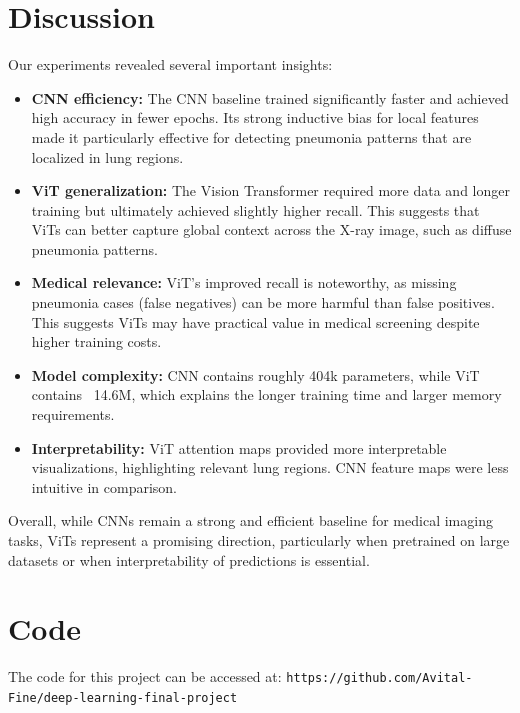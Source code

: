 \documentclass{article}
\begin{document}
\section{Discussion}

Our experiments revealed several important insights:

\begin{itemize}
    \item \textbf{CNN efficiency:} The CNN baseline trained significantly faster and achieved high accuracy in fewer epochs. Its strong inductive bias for local features made it particularly effective for detecting pneumonia patterns that are localized in lung regions.
    \item \textbf{ViT generalization:} The Vision Transformer required more data and longer training but ultimately achieved slightly higher recall. This suggests that ViTs can better capture global context across the X-ray image, such as diffuse pneumonia patterns.
    \item \textbf{Medical relevance:} ViT’s improved recall is noteworthy, as missing pneumonia cases (false negatives) can be more harmful than false positives. This suggests ViTs may have practical value in medical screening despite higher training costs.
    \item \textbf{Model complexity:} CNN contains roughly 404k parameters, while ViT contains ~14.6M, which explains the longer training time and larger memory requirements.
    \item \textbf{Interpretability:} ViT attention maps provided more interpretable visualizations, highlighting relevant lung regions. CNN feature maps were less intuitive in comparison.
\end{itemize}

Overall, while CNNs remain a strong and efficient baseline for medical imaging tasks, ViTs represent a promising direction, particularly when pretrained on large datasets or when interpretability of predictions is essential.

\section{Code}
The code for this project can be accessed at: \texttt{https://github.com/Avital-Fine/deep-learning-final-project}



\end{document}
